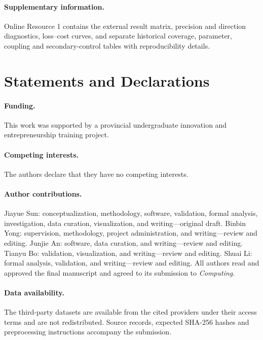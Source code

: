 \documentclass[smallextended]{svjour3}
\begin{document}
\paragraph{Supplementary information.} Online Resource 1 contains the external result matrix, precision and direction diagnostics, loss--cost curves, and separate historical coverage, parameter, coupling and secondary-control tables with reproducibility details.
\section*{Statements and Declarations}
\paragraph{Funding.} This work was supported by a provincial undergraduate innovation and entrepreneurship training project.
\paragraph{Competing interests.} The authors declare that they have no competing interests.
\paragraph{Author contributions.} Jiayue Sun: conceptualization, methodology, software, validation, formal analysis, investigation, data curation, visualization, and writing---original draft. Binbin Yong: supervision, methodology, project administration, and writing---review and editing. Junjie An: software, data curation, and writing---review and editing. Tianyu Bo: validation, visualization, and writing---review and editing. Shuai Li: formal analysis, validation, and writing---review and editing. All authors read and approved the final manuscript and agreed to its submission to \textit{Computing}.
\paragraph{Data availability.} The third-party datasets are available from the cited providers under their access terms and are not redistributed. Source records, expected SHA-256 hashes and preprocessing instructions accompany the submission.
\end{document}
